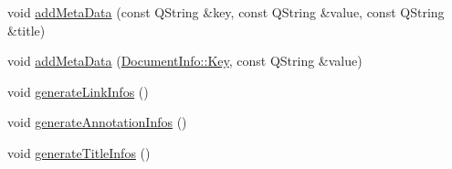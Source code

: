 \begin{DoxyCompactItemize}
\item 
void \hyperlink{classOkular_1_1TextDocumentGeneratorPrivate_adbdb2c00e0db9a29e7414a41fb3bdf24}{add\+Meta\+Data} (const Q\+String \&key, const Q\+String \&value, const Q\+String \&title)
\item 
void \hyperlink{classOkular_1_1TextDocumentGeneratorPrivate_a5550ad77c8b15552cb1e2ce2a9a15486}{add\+Meta\+Data} (\hyperlink{classOkular_1_1DocumentInfo_a3a6e5f7fb246e29bcb2e830b6f770791}{Document\+Info\+::\+Key}, const Q\+String \&value)
\item 
void \hyperlink{classOkular_1_1TextDocumentGeneratorPrivate_a28f9bc59e4100d577d4e74109b0fdf16}{generate\+Link\+Infos} ()
\item 
void \hyperlink{classOkular_1_1TextDocumentGeneratorPrivate_aa4c252838dc01ca44941d7b3a9dfcf38}{generate\+Annotation\+Infos} ()
\item 
void \hyperlink{classOkular_1_1TextDocumentGeneratorPrivate_a276197eeaadfe9de95eefd14289b82d6}{generate\+Title\+Infos} ()
\end{DoxyCompactItemize}

